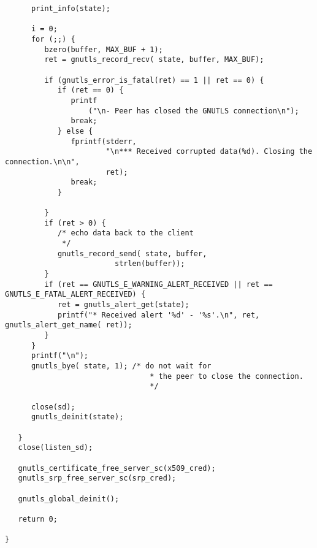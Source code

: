 \begin{verbatim}
      print_info(state);

      i = 0;
      for (;;) {
         bzero(buffer, MAX_BUF + 1);
         ret = gnutls_record_recv( state, buffer, MAX_BUF);

         if (gnutls_error_is_fatal(ret) == 1 || ret == 0) {
            if (ret == 0) {
               printf
                   ("\n- Peer has closed the GNUTLS connection\n");
               break;
            } else {
               fprintf(stderr,
                       "\n*** Received corrupted data(%d). Closing the connection.\n\n",
                       ret);
               break;
            }

         }
         if (ret > 0) {
            /* echo data back to the client
             */
            gnutls_record_send( state, buffer,
                         strlen(buffer));
         }
         if (ret == GNUTLS_E_WARNING_ALERT_RECEIVED || ret == GNUTLS_E_FATAL_ALERT_RECEIVED) {
            ret = gnutls_alert_get(state);
            printf("* Received alert '%d' - '%s'.\n", ret, gnutls_alert_get_name( ret));
         }
      }
      printf("\n");
      gnutls_bye( state, 1); /* do not wait for
                                 * the peer to close the connection.
                                 */

      close(sd);
      gnutls_deinit(state);

   }
   close(listen_sd);

   gnutls_certificate_free_server_sc(x509_cred);
   gnutls_srp_free_server_sc(srp_cred);

   gnutls_global_deinit();

   return 0;

}

\end{verbatim}
